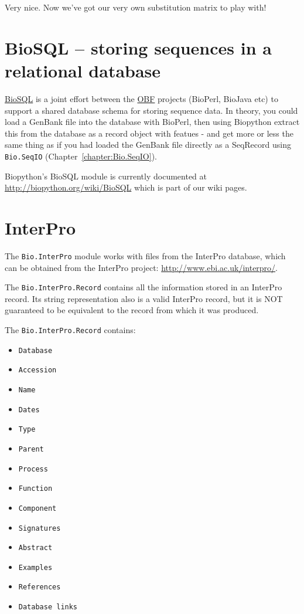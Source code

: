 \documentclass{report}
\begin{document}
Very nice. Now we've got our very own substitution matrix to play with!

\section{BioSQL -- storing sequences in a relational database}
\label{sec:BioSQL}
\href{http://www.biosql.org/}{BioSQL} is a joint effort between the
\href{http://open-bio.org/}{OBF} projects (BioPerl, BioJava etc) to support a
shared database schema for storing sequence data. In theory, you could load a
GenBank file into the database with BioPerl, then using Biopython extract this
from the database as a record object with featues - and get more or less the same
thing as if you had loaded the GenBank file directly as a SeqRecord using
\verb|Bio.SeqIO| (Chapter~\ref{chapter:Bio.SeqIO}).

Biopython's BioSQL module is currently documented at
\url{http://biopython.org/wiki/BioSQL} which is part of our wiki pages.

\section{InterPro}

The \verb|Bio.InterPro| module works with files from the
InterPro database, which can be obtained from the InterPro project:
\url{http://www.ebi.ac.uk/interpro/}.

The \verb|Bio.InterPro.Record| contains all the information stored in
an InterPro record. Its string representation also is a valid InterPro
record, but it is NOT guaranteed to be equivalent to the record
from which it was produced.

The \verb|Bio.InterPro.Record| contains:

\begin{itemize}
  \item \verb|Database|
  \item \verb|Accession|
  \item \verb|Name|
  \item \verb|Dates|
  \item \verb|Type|
  \item \verb|Parent|
  \item \verb|Process|
  \item \verb|Function|
  \item \verb|Component|
  \item \verb|Signatures|
  \item \verb|Abstract|
  \item \verb|Examples|
  \item \verb|References|
  \item \verb|Database links|
\end{itemize}
\end{document}
